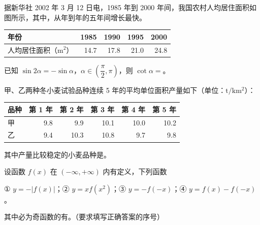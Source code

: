 \Needspace{0.4\textheight}
\begin{question}
据新华社 2002 年 3 月 12 日电，1985 年到 2000 年间，我国农村人均居住面积如图所示，其中，从\gkblank{}年到\gkblank{}年的五年间增长最快。
\nopagebreak[4]
\begin{center}\end{center}
\nopagebreak[4]
\begin{center}
\begin{tabular}{lrrrr}
\toprule
年份 & 1985 & 1990 & 1995 & 2000 \\
\midrule
人均居住面积（$\mathrm{m^2}$） & 14.7 & 17.8 & 21.0 & 24.8 \\
\bottomrule
\end{tabular}
\end{center}

\end{question}
\begin{question}
已知 $\sin2\alpha=-\sin\alpha$，$\alpha\in\left(\dfrac\pi2,\pi\right)$，则 $\cot\alpha=$\gkblank{}。

\end{question}
\begin{question}
甲、乙两种冬小麦试验品种连续 5 年的平均单位面积产量如下（单位：$\mathrm{t/km^2}$）：

\begin{center}
\begin{tabular}{lrrrrr}
\toprule
品种 & 第 1 年 & 第 2 年 & 第 3 年 & 第 4 年 & 第 5 年 \\
\midrule
甲 & 9.8 & 9.9 & 10.1 & 10.0 & 10.2 \\
乙 & 9.4 & 10.3 & 10.8 & 9.7 & 9.8 \\
\bottomrule
\end{tabular}
\end{center}

其中产量比较稳定的小麦品种是\gkblank{}。

\end{question}
\begin{question}
设函数 $f(x)$ 在 $(-\infty,+\infty)$ 内有定义，下列函数

① $y=-|f(x)|$；② $y=xf(x^2)$；③ $y=-f(-x)$；④ $y=f(x)-f(-x)$。

其中必为奇函数的有\gkblank{}。（要求填写正确答案的序号）

\end{question}

